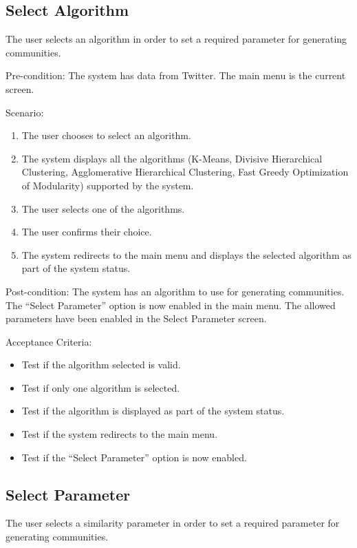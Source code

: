 \subsection{Select Algorithm}
\label{us:selectalgo}


The user selects an algorithm in order to set a required parameter for generating communities.


Pre-condition: The system has data from Twitter. The main menu is the current screen.


Scenario:
\begin{enumerate}
	\item The user chooses to select an algorithm.
	\item The system displays all the algorithms (K-Means, Divisive Hierarchical Clustering, Agglomerative Hierarchical Clustering, Fast Greedy Optimization of Modularity) supported by the system.
	\item The user selects one of the algorithms.
	\item The user confirms their choice.
	\item The system redirects to the main menu and displays the selected algorithm as part of the system status.
\end{enumerate}


Post-condition: The system has an algorithm to use for generating communities. The ``Select Parameter'' option
is now enabled in the main menu. The allowed parameters have been enabled in the Select Parameter screen.


Acceptance Criteria:
\begin{itemize}
	\item Test if the algorithm selected is valid.
	\item Test if only one algorithm is selected.
	\item Test if the algorithm is displayed as part of the system status.
	\item Test if the system redirects to the main menu.
	\item Test if the ``Select Parameter'' option is now enabled.
\end{itemize}


\subsection{Select Parameter}
\label{us:selectparam}


The user selects a similarity parameter in order to set a required parameter for generating communities.



